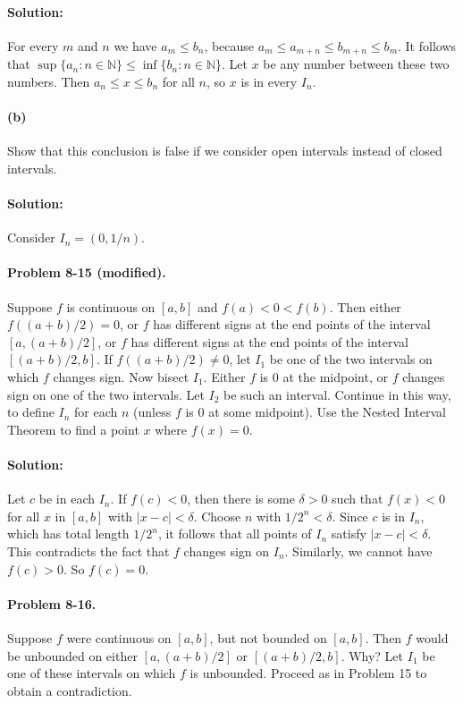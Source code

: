 \documentclass{article}
\begin{document}
\paragraph{Solution:} For every $m$ and $n$ we have $a_m \leq b_n$, because
$a_m \leq a_{m+n} \leq b_{m+n} \leq b_m$. It follows that $\sup\{a_n: n \in
\mathbb{N}\} \leq \inf\{b_n: n \in \mathbb{N}\}$. Let $x$ be any number between
these two numbers. Then $a_n \leq x \leq b_n$ for all $n$, so $x$ is in every
$I_n$.

\paragraph{(b)} Show that this conclusion is false if we consider open
intervals instead of closed intervals.

\paragraph{Solution:} Consider $I_n = (0, 1/n)$.

\paragraph{Problem 8-15 (modified).} Suppose $f$ is continuous on $[a, b]$ and
$f(a) < 0 < f(b)$. Then either $f((a + b)/2) = 0$, or $f$ has different signs
at the end points of the interval $[a, (a + b)/2]$, or $f$ has different signs
at the end points of the interval $[(a + b)/2, b]$. If $f((a + b)/2) \neq 0$,
let $I_1$ be one of the two intervals on which $f$ changes sign. Now bisect
$I_1$.  Either $f$ is 0 at the midpoint, or $f$ changes sign on one of the two
intervals. Let $I_2$ be such an interval. Continue in this way, to define $I_n$
for each $n$ (unless $f$ is 0 at some midpoint). Use the Nested Interval
Theorem to find a point $x$ where $f(x) = 0$.

\paragraph{Solution:} Let $c$ be in each $I_n$. If $f(c) < 0$, then there is
some $\delta > 0$ such that $f(x) < 0$ for all $x$ in $[a, b]$ with $|x - c| <
\delta$. Choose $n$ with $1/2^n < \delta$. Since $c$ is in $I_n$, which has
total length $1/2^n$, it follows that all points of $I_n$ satisfy $|x - c| <
\delta$. This contradicts the fact that $f$ changes sign on $I_n$. Similarly,
we cannot have $f(c) > 0$. So $f(c) = 0$.

\paragraph{Problem 8-16.} Suppose $f$ were continuous on $[a, b]$, but not
bounded on $[a, b]$. Then $f$ would be unbounded on either $[a, (a + b)/2]$ or
$[(a + b)/2, b]$. Why? Let $I_1$ be one of these intervals on which $f$ is
unbounded. Proceed as in Problem 15 to obtain a contradiction.
\end{document}
